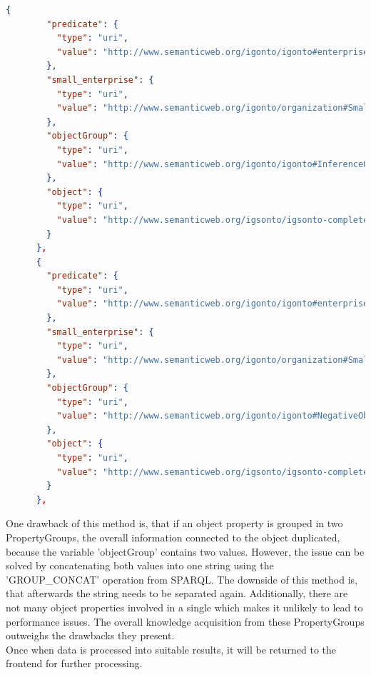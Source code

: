 \documentclass[
  a4paper,  %
  twoside,  %
  bibliography=totoc,
  headsepline,
  cleardoublepage=empty,
  parskip=half,
  draft=false
]{scrbook}
\begin{document}
\begin{lstlisting}[language=json,firstnumber=1]
      {
        "predicate": {
          "type": "uri",
          "value": "http://www.semanticweb.org/igonto/igonto#enterpriseDoesNotNeed"
        },
        "small_enterprise": {
          "type": "uri",
          "value": "http://www.semanticweb.org/igonto/organization#Small_Enterprise_Instance"
        },
        "objectGroup": {
          "type": "uri",
          "value": "http://www.semanticweb.org/igonto/igonto#InferenceObjectPropertyGroup"
        },
        "object": {
          "type": "uri",
          "value": "http://www.semanticweb.org/igsonto/igsonto-complete#RIMSOlutionInstance"
        }
      },
      {
        "predicate": {
          "type": "uri",
          "value": "http://www.semanticweb.org/igonto/igonto#enterpriseDoesNotNeed"
        },
        "small_enterprise": {
          "type": "uri",
          "value": "http://www.semanticweb.org/igonto/organization#Small_Enterprise_Instance"
        },
        "objectGroup": {
          "type": "uri",
          "value": "http://www.semanticweb.org/igonto/igonto#NegativeObjectPropertyGroup"
        },
        "object": {
          "type": "uri",
          "value": "http://www.semanticweb.org/igsonto/igsonto-complete#RIMSOlutionInstance"
        }
      },
\end{lstlisting}\label{lst:jsonResult2}

One drawback of this method is, that if an object property is grouped in two PropertyGroups, the overall information connected to the object duplicated, because the variable 'objectGroup' contains two values. However, the issue can be solved by concatenating both values into one string using the 'GROUP\_CONCAT' operation from SPARQL. The downside of this method is, that afterwards the string needs to be separated again. Additionally, there are not many object properties involved in a single which makes it unlikely to lead to performance issues. The overall knowledge acquisition from these PropertyGroups outweighs the drawbacks they present.\\
Once when data is processed into suitable results, it will be returned to the frontend for further processing.  
\end{document}
